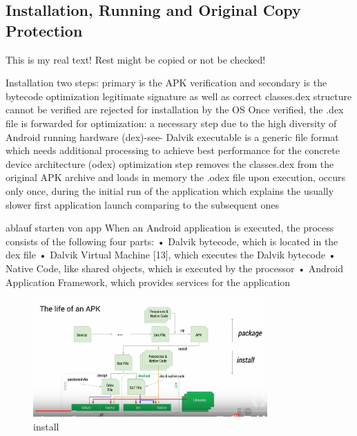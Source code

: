 \subsection{Installation, Running and Original Copy Protection} \label{subsection:android-copy}
This is my real text! Rest might be copied or not be checked!

%
Installation two steps:  primary is the APK verification and secondary is the bytecode optimization\newline
legitimate signature as well as correct classes.dex structure cannot be verified are rejected for installation by the OS\newline
Once verified, the .dex file is forwarded for optimization: a necessary step due to the high diversity of Android running hardware (dex)-see- Dalvik executable is a generic file format which needs additional processing to achieve best performance for the concrete device architecture (odex)\newline
optimization\newline
step removes the classes.dex from the original APK archive and loads in memory the .odex file upon execution, occurs only once, during the initial run of the application which explains the usually slower first application launch comparing to the subsequent ones

ablauf starten von app\newline
When an Android application is executed, the process consists of the following four parts:
• Dalvik bytecode, which is located in the dex file
• Dalvik Virtual Machine [13], which executes the Dalvik bytecode
• Native Code, like shared objects, which is executed by the processor
• Android Application Framework, which provides services for the application\newline
\cite{kovachevaMaster}
%
\begin{figure}[h]
    \centering
    \includegraphics[width=0.8\textwidth]{data/install.png}
    \caption{install}
    \label{fig:install}
\end{figure}

